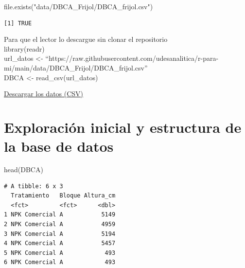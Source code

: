 \documentclass[
  spanish,
  letterpaper,
  DIV=11,
  numbers=noendperiod]{scrreprt}
\newenvironment{Shaded}{\begin{snugshade}}{\end{snugshade}}
\newcommand{\FunctionTok}[1]{\textcolor[rgb]{0.28,0.35,0.67}{#1}}
\newcommand{\NormalTok}[1]{\textcolor[rgb]{0.00,0.23,0.31}{#1}}
\newcommand{\StringTok}[1]{\textcolor[rgb]{0.13,0.47,0.30}{#1}}
\begin{document}
\begin{Shaded}
\begin{Highlighting}[]
\FunctionTok{file.exists}\NormalTok{(}\StringTok{"data/DBCA\_Frijol/DBCA\_frijol.csv"}\NormalTok{)}
\end{Highlighting}
\end{Shaded}

\begin{verbatim}
[1] TRUE
\end{verbatim}

\begin{tcolorbox}[enhanced jigsaw, colback=white, breakable, toptitle=1mm, toprule=.15mm, colbacktitle=quarto-callout-note-color!10!white, bottomrule=.15mm, coltitle=black, titlerule=0mm, opacityback=0, leftrule=.75mm, bottomtitle=1mm, colframe=quarto-callout-note-color-frame, left=2mm, title=\textcolor{quarto-callout-note-color}{\faInfo}\hspace{0.5em}{Nota}, rightrule=.15mm, opacitybacktitle=0.6, arc=.35mm]

Para que el lector lo descargue sin clonar el repositorio\\
library(readr)\\
url\_datos \textless-
``https://raw.githubusercontent.com/udesanalitica/r-para-mi/main/data/DBCA\_Frijol/DBCA\_frijol.csv''\\
DBCA \textless- read\_csv(url\_datos)

\end{tcolorbox}

\href{data/DBCA_Frijol/DBCA_frijol.csv}{Descargar los datos (CSV)}

\section{Exploración inicial y estructura de la base de
datos}\label{exploraciuxf3n-inicial-y-estructura-de-la-base-de-datos-1}

\begin{Shaded}
\begin{Highlighting}[]
\FunctionTok{head}\NormalTok{(DBCA)}
\end{Highlighting}
\end{Shaded}

\begin{verbatim}
# A tibble: 6 x 3
  Tratamiento   Bloque Altura_cm
  <fct>         <fct>      <dbl>
1 NPK Comercial A           5149
2 NPK Comercial A           4959
3 NPK Comercial A           5194
4 NPK Comercial A           5457
5 NPK Comercial A            493
6 NPK Comercial A            493
\end{verbatim}
\end{document}
